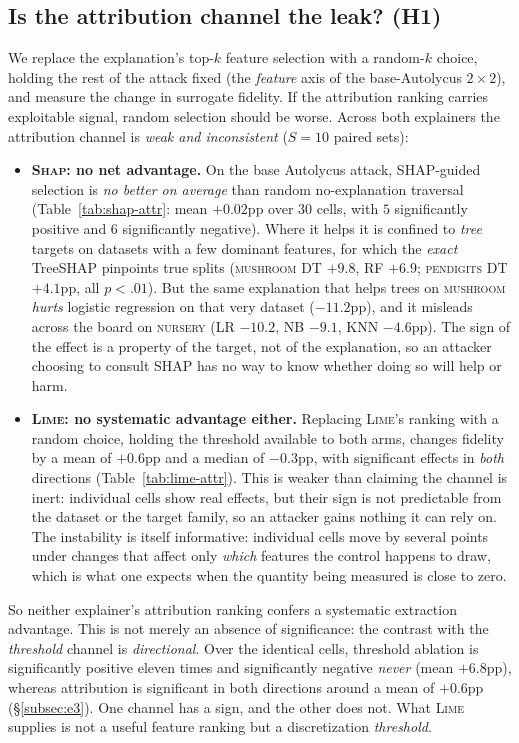 \documentclass[sigconf,anonymous,review]{acmart}
\begin{document}
\subsection{Is the attribution channel the leak? (H1)}
\label{subsec:e2}
We replace the explanation's top-$k$ feature selection with a random-$k$ choice, holding the rest of
the attack fixed (the \emph{feature} axis of the base-Autolycus $2{\times}2$), and measure the change
in surrogate fidelity. If the attribution ranking carries exploitable signal, random selection should
be worse. Across both explainers the attribution channel is \emph{weak and inconsistent} ($S{=}10$
paired sets):
\begin{itemize}
  \item \textbf{\textsc{Shap}: no net advantage.} On the base Autolycus attack, SHAP-guided selection
  is \emph{no better on average} than random no-explanation traversal (Table~\ref{tab:shap-attr}: mean $+0.02$pp over $30$ cells, with $5$ significantly positive and $6$ significantly negative). Where it
  helps it is confined to \emph{tree} targets on datasets with a few dominant features, for which the
  \emph{exact} TreeSHAP pinpoints true splits (\textsc{mushroom} DT $+9.8$, RF $+6.9$;
  \textsc{pendigits} DT $+4.1$pp, all $p{<}.01$). But the same explanation that helps trees on
  \textsc{mushroom} \emph{hurts} logistic regression on that very dataset ($-11.2$pp), and it misleads
  across the board on \textsc{nursery} (LR $-10.2$, NB $-9.1$, KNN $-4.6$pp). The sign of the effect is
  a property of the target, not of the explanation, so an attacker choosing to consult SHAP has no way
  to know whether doing so will help or harm.
  \item \textbf{\textsc{Lime}: no systematic advantage either.} Replacing \textsc{Lime}'s ranking with a random choice, holding the threshold available to both arms, changes fidelity by a mean of
  $+0.6$pp and a median of $-0.3$pp, with significant effects in \emph{both} directions
  (Table~\ref{tab:lime-attr}). This is weaker than claiming the channel is inert: individual cells
  show real effects, but their sign is not predictable from the dataset or the target family, so an
  attacker gains nothing it can rely on. The instability is itself informative: individual cells move
  by several points under changes that affect only \emph{which} features the control happens to draw,
  which is what one expects when the quantity being measured is close to zero.
\end{itemize}
So neither explainer's attribution ranking confers a systematic extraction advantage. This is not
merely an absence of significance: the contrast with the \emph{threshold} channel is \emph{directional}.
Over the identical cells, threshold ablation is significantly positive eleven times and significantly
negative \emph{never} (mean $+6.8$pp), whereas attribution is significant in both directions around a
mean of $+0.6$pp (\S\ref{subsec:e3}). One channel has a sign, and the other does not.
What \textsc{Lime} supplies is not a useful feature ranking but a discretization \emph{threshold}.
\end{document}
